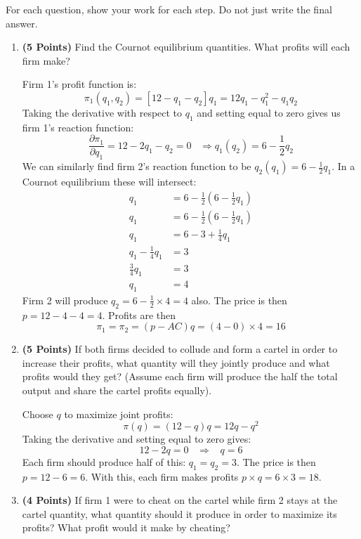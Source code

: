 \documentclass[11pt]{article}
\newcounter{question}[section]
\newenvironment{subquestions}{
  \begin{enumerate}[label=(\roman*)]}{\end{enumerate}}
\begin{document}
For each question, show your work for each step. Do not just write the final answer.
\begin{subquestions}
  \item \textbf{(5 Points)} Find the Cournot equilibrium quantities. What profits will each firm make?

    \textcolor{solution-color}{
      Firm 1's profit function is:
      \[
        \pi_1\left( q_1,q_2 \right)=\left[ 12-q_1-q_2 \right]q_1=12q_1 -q_1^2-q_1q_2
       \]
       Taking the derivative with respect to $q_1$ and setting equal to zero gives us firm 1's reaction function:
       \[ \frac{\partial \pi_1}{\partial q_1}=12-2q_1-q_2=0 \;\;\;\Longrightarrow q_1\left( q_2 \right)=6-\frac{1}{2}q_2\]
       We can similarly find firm 2's reaction function to be $q_2\left( q_1 \right)=6-\frac{1}{2}q_1$. In a Cournot equilibrium these will intersect:
       \begin{align*}
         q_1 &= 6 - \frac{1}{2}\left( 6-\frac{1}{2}q_1 \right)\\
         q_1 &= 6 - \frac{1}{2}\left( 6-\frac{1}{2}q_1 \right)\\
         q_1 &= 6 - 3+ \frac{1}{4}q_1\\
         q_1-\frac{1}{4}q_1 &= 3 \\
         \frac{3}{4}q_1 &= 3 \\
         q_1&=4
       \end{align*}
       Firm 2 will produce $q_2=6-\frac{1}{2}\times 4= 4$ also. The price is then $p=12-4-4=4$. Profits are then \[\pi_1=\pi_2=\left( p-AC \right)q=\left( 4-0 \right)\times 4=16\]
     }
  \item \textbf{(5 Points)} If both firms decided to collude and form a cartel in order to increase their profits, what quantity will they jointly produce and what profits would they get? (Assume each firm will produce the half the total output and share the cartel profits equally).

    \textcolor{solution-color}{
      Choose $q$ to maximize joint profits:
      \[
        \pi\left( q \right)=\left( 12-q \right)q=12q-q^2
      \]
      Taking the derivative and setting equal to zero gives:
      \[
        12-2q=0\;\;\;\Longrightarrow\;\;\; q=6
      \]
      Each firm should produce half of this: $q_1=q_2=3$. The price is then $p=12-6=6$. With this, each firm makes profits $p\times q = 6\times 3 = 18$.
    }
  \item \textbf{(4 Points)} If firm 1 were to cheat on the cartel while firm 2 stays at the cartel quantity, what quantity should it produce in order to maximize its profits? What profit would it make by cheating?


\end{subquestions}
\end{document}
